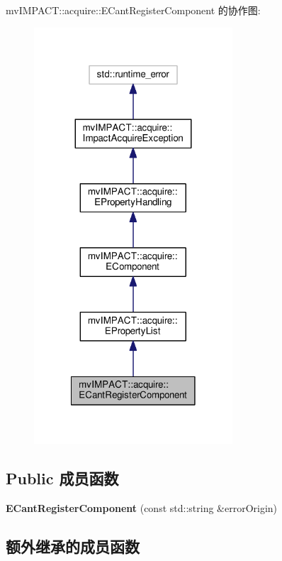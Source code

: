 mv\+I\+M\+P\+A\+C\+T\+:\+:acquire\+:\+:E\+Cant\+Register\+Component 的协作图\+:
\nopagebreak
\begin{figure}[H]
\begin{center}
\leavevmode
\includegraphics[width=210pt]{classmv_i_m_p_a_c_t_1_1acquire_1_1_e_cant_register_component__coll__graph}
\end{center}
\end{figure}
\subsection*{Public 成员函数}
\begin{DoxyCompactItemize}
\item 
\hypertarget{classmv_i_m_p_a_c_t_1_1acquire_1_1_e_cant_register_component_ae6a4684b567bc494aa58561ccabf7729}{{\bfseries E\+Cant\+Register\+Component} (const std\+::string \&error\+Origin)}\label{classmv_i_m_p_a_c_t_1_1acquire_1_1_e_cant_register_component_ae6a4684b567bc494aa58561ccabf7729}

\end{DoxyCompactItemize}
\subsection*{额外继承的成员函数}


